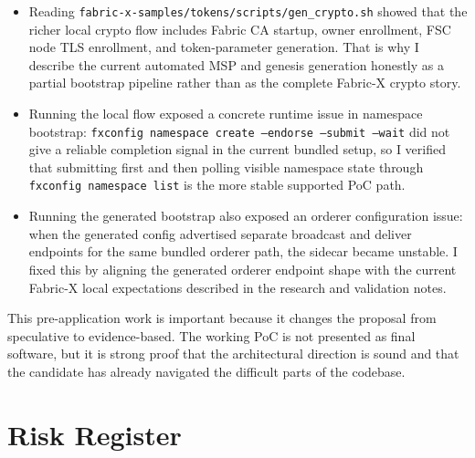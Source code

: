 \begin{tcolorbox}[colback=green!5!white, colframe=green!60!black,
  title=Pre-Application Research Completed, fonttitle=\bfseries, arc=4pt]
\begin{itemize}[leftmargin=*]
  \item Reading \texttt{fabric-x-samples/tokens/scripts/gen\_crypto.sh} showed that the richer local crypto flow includes Fabric CA startup, owner enrollment, FSC node TLS enrollment, and token-parameter generation. That is why I describe the current automated MSP and genesis generation honestly as a partial bootstrap pipeline rather than as the complete Fabric-X crypto story.
  \item Running the local flow exposed a concrete runtime issue in namespace bootstrap: \texttt{fxconfig namespace create --endorse --submit --wait} did not give a reliable completion signal in the current bundled setup, so I verified that submitting first and then polling visible namespace state through \texttt{fxconfig namespace list} is the more stable supported PoC path.
  \item Running the generated bootstrap also exposed an orderer configuration issue: when the generated config advertised separate broadcast and deliver endpoints for the same bundled orderer path, the sidecar became unstable. I fixed this by aligning the generated orderer endpoint shape with the current Fabric-X local expectations described in the research and validation notes.
\end{itemize}
\end{tcolorbox}

This pre-application work is important because it changes the proposal from speculative to evidence-based. The working PoC is not presented as final software, but it is strong proof that the architectural direction is sound and that the candidate has already navigated the difficult parts of the codebase.
\section{Risk Register}

